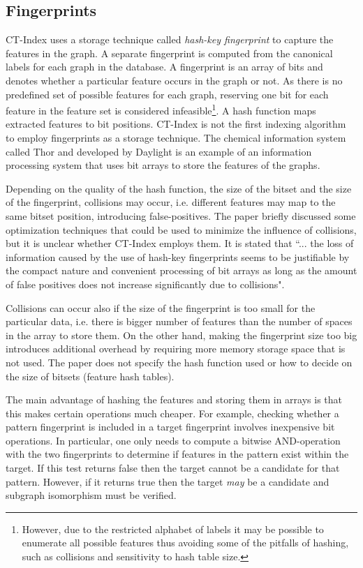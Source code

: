 \documentclass{l4proj}
\theoremstyle{definition}
\begin{document}
\subsection{Fingerprints}
CT-Index uses a storage technique called \emph{hash-key fingerprint} to capture the features in the graph. A separate fingerprint is computed from the canonical labels for each graph in the database. A fingerprint is an array of bits and denotes whether a particular feature occurs in the graph or not. As there is no predefined set of possible features for each graph, reserving one bit for each feature in the feature set is considered infeasible\footnote{However, due to the restricted alphabet of labels it may be possible to enumerate all possible features thus avoiding some of the pitfalls of hashing, such as collisions and sensitivity to hash table size.}. A hash function maps extracted features to bit positions.
CT-Index is not the first indexing algorithm to employ fingerprints as a storage technique. The chemical information system called Thor and developed by Daylight \cite{fingerprints} is an example of an information processing system that uses bit arrays to store the features of the graphs.

Depending on the quality of the hash function, the size of the bitset and the size of the fingerprint, collisions may occur, i.e. different features may map to the same bitset position, introducing false-positives. The \cite{ctindex} paper briefly discussed some optimization techniques that could be used to minimize the influence of collisions, but it is unclear whether CT-Index employs them. 
It is stated that ``... the loss of information caused by the use of hash-key fingerprints seems to be justifiable by the compact nature and convenient processing of bit arrays as long as the amount of false positives does not increase significantly due to collisions".

Collisions can occur also if the size of the fingerprint is too small for the particular data, i.e. there is bigger number of features than the number of spaces in the array to store them. On the other hand, making the fingerprint size too big introduces additional overhead by requiring more memory storage space that is not used. The paper does not specify the hash function used or how to decide on the size of bitsets (feature hash tables). 

The main advantage of hashing the features and storing them in arrays is that this makes certain operations much cheaper. For example, checking whether a pattern fingerprint is included in a target fingerprint involves inexpensive bit operations. In particular, one only needs to compute a bitwise AND-operation with the two fingerprints to determine if features in the pattern exist within the target. If this test returns false then the target cannot be a candidate for that pattern. However, if it returns true then the target \emph{may} be a candidate and subgraph isomorphism must be verified.
\end{document}
